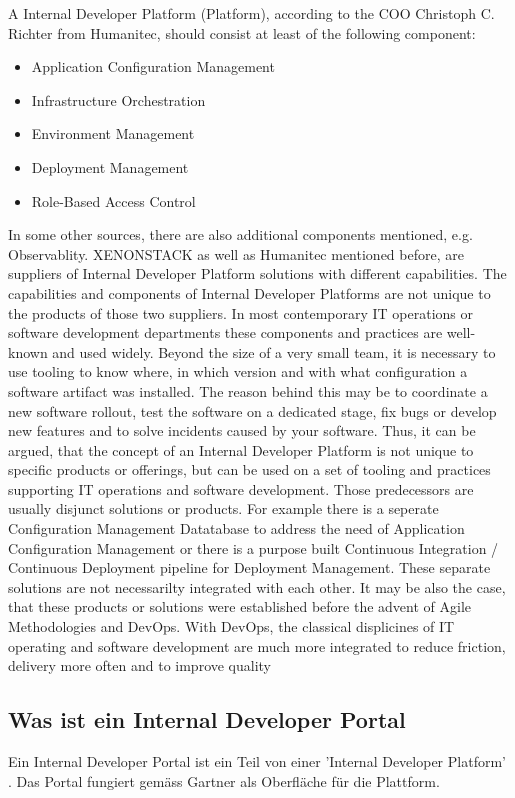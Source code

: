 \documentclass[a4paper,12pt]{article}
\begin{document}
    A Internal Developer Platform (Platform), according to the COO Christoph C. Richter from Humanitec\cite{richteretal},
    should consist at least of the following component:
    \begin{itemize}
        \item Application Configuration Management
        \item Infrastructure Orchestration
        \item Environment Management
        \item Deployment Management
        \item Role-Based Access Control
    \end{itemize}
    In some other sources, there are also additional components mentioned, e.g. Observablity\cite{xenon}. XENONSTACK as
    well as Humanitec mentioned before, are suppliers of Internal Developer Platform solutions with different capabilities.
    The capabilities and components of Internal Developer Platforms are not unique to the products of those two suppliers.
    In most contemporary IT operations or software development departments these components and practices are well-known
    and used widely.
    Beyond the size of a very small team, it is necessary to use tooling to know where, in which version and with what
    configuration a software artifact was installed.
    The reason behind this may be to coordinate a new software rollout, test the software on a dedicated stage, fix bugs
    or develop new features and to solve incidents caused by your software.
    Thus, it can be argued, that the concept of an Internal Developer Platform is not unique to specific products
    or offerings, but can be used on a set of tooling and practices supporting IT operations and software development.
    Those predecessors are usually disjunct solutions or products.
    For example there is a seperate Configuration Management Datatabase
    to address the need of Application Configuration Management or there is a purpose built Continuous Integration /
    Continuous Deployment pipeline for Deployment Management.
    These separate solutions are not necessarilty integrated with each other.
    It may be also the case, that these
    products or solutions were established before the advent of Agile Methodologies and DevOps. With DevOps, the classical
    displicines of IT operating and software development are much more integrated to reduce friction, delivery more often
    and to improve quality

    \subsection{Was ist ein Internal Developer Portal}
    Ein Internal Developer Portal ist ein Teil von einer 'Internal Developer Platform' \cite{idporgdevportal}. Das
    Portal fungiert gemäss Gartner\cite{gartner} als Oberfläche für die Plattform.
\end{document}
